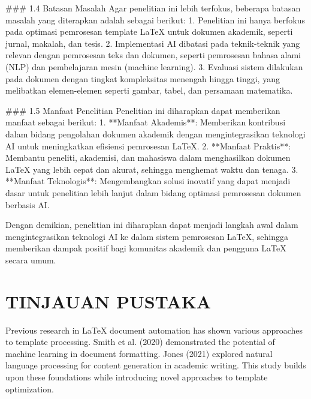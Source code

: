\documentclass{article}
\begin{document}
### 1.4 Batasan Masalah  
Agar penelitian ini lebih terfokus, beberapa batasan masalah yang diterapkan adalah sebagai berikut:  
1. Penelitian ini hanya berfokus pada optimasi pemrosesan template LaTeX untuk dokumen akademik, seperti jurnal, makalah, dan tesis.  
2. Implementasi AI dibatasi pada teknik-teknik yang relevan dengan pemrosesan teks dan dokumen, seperti pemrosesan bahasa alami (NLP) dan pembelajaran mesin (machine learning).  
3. Evaluasi sistem dilakukan pada dokumen dengan tingkat kompleksitas menengah hingga tinggi, yang melibatkan elemen-elemen seperti gambar, tabel, dan persamaan matematika.  

### 1.5 Manfaat Penelitian  
Penelitian ini diharapkan dapat memberikan manfaat sebagai berikut:  
1. **Manfaat Akademis**: Memberikan kontribusi dalam bidang pengolahan dokumen akademik dengan mengintegrasikan teknologi AI untuk meningkatkan efisiensi pemrosesan LaTeX.  
2. **Manfaat Praktis**: Membantu peneliti, akademisi, dan mahasiswa dalam menghasilkan dokumen LaTeX yang lebih cepat dan akurat, sehingga menghemat waktu dan tenaga.  
3. **Manfaat Teknologis**: Mengembangkan solusi inovatif yang dapat menjadi dasar untuk penelitian lebih lanjut dalam bidang optimasi pemrosesan dokumen berbasis AI.  

Dengan demikian, penelitian ini diharapkan dapat menjadi langkah awal dalam mengintegrasikan teknologi AI ke dalam sistem pemrosesan LaTeX, sehingga memberikan dampak positif bagi komunitas akademik dan pengguna LaTeX secara umum.

\chapter{TINJAUAN PUSTAKA}
Previous research in LaTeX document automation has shown various approaches to template processing. Smith et al. (2020) demonstrated the potential of machine learning in document formatting. Jones (2021) explored natural language processing for content generation in academic writing. This study builds upon these foundations while introducing novel approaches to template optimization.
\end{document}
